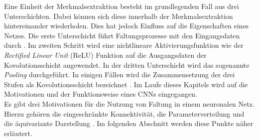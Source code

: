 	 	
	
		Eine Einheit der Merkmalsextraktion besteht im grundlegenden Fall aus drei Unterschichten. Dabei können sich diese innerhalb der Merkmalsextraktion hintereinander wiederholen. Dies hat jedoch Einfluss auf die Eigenschaften eines Netzes. Die erste Unterschicht führt Faltungsprozesse mit den Eingangsdaten durch \cite{deeplearning}. Im zweiten Schritt wird eine nichtlineare Aktivierungsfunktion wie der \textit{Rectified Linear Unit} (ReLU) Funktion auf die Ausgangsdaten der Kovolutionsschicht angewendet. In der dritten Unterschicht wird das sogenannte \textit{Pooling} durchgeführt. In einigen Fällen wird die Zusammensetzung der drei Stufen als Kovolutionsschicht bezeichnet \cite{deeplearning}. Im Laufe dieses Kapitels wird auf die Motivationen und der Funktionsweise eines CNNs eingegangen.\\
		
		Es gibt drei Motivationen für die Nutzung von Faltung in einem neuronalen Netz. Hierzu gehören die eingeschränkte Konnektivität, die Parameterverteilung und die äquivariante Darstellung \cite{deeplearning}. Im folgenden Abschnitt werden diese Punkte näher erläutert.\\
		
